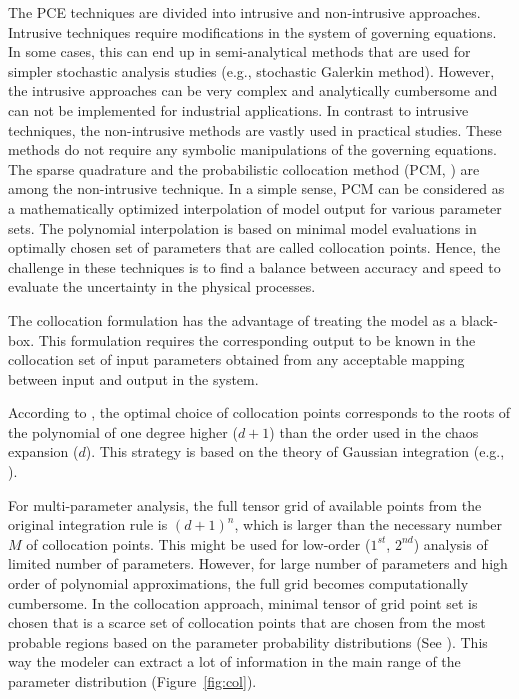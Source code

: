 The PCE techniques are divided into intrusive
\cite{Ghanem1993,Matthies2005,Xiu2003} and non-intrusive
\cite{Keese2003,Isukapalli1998,nLi2007,oladyshkinintegrative} approaches.
Intrusive techniques require modifications in the system of governing
equations. In some cases, this can end up in semi-analytical methods that are
used for simpler stochastic analysis studies (e.g., stochastic Galerkin
method). However, the intrusive approaches can be very complex and analytically
cumbersome and can not be implemented for industrial applications. In contrast
to intrusive techniques, the non-intrusive methods are vastly used in practical
studies. These methods do not require any symbolic manipulations of the
governing equations. The sparse quadrature and the probabilistic collocation
method (PCM, \cite{nLi2007,oladyshkinintegrative}) are among the non-intrusive
technique. In a simple sense, PCM can be considered as a mathematically
optimized interpolation of model output for various parameter sets. The
polynomial interpolation is based on minimal model evaluations in optimally
chosen set of parameters that are called collocation points. Hence, the
challenge in these techniques is to find a balance between accuracy and speed
to evaluate the uncertainty in the physical processes.

The collocation formulation has the advantage of treating the model as a
black-box. This formulation requires the corresponding output to be known in
the collocation set of input parameters obtained from any acceptable mapping
between input and output in the system.

According to \cite{Villadsen1978}, the optimal choice of collocation
points corresponds to the roots of the polynomial of one degree higher ($d+1$)
than the order used in the chaos expansion ($d$). This strategy is based on the
theory of Gaussian integration (e.g., \cite{Abramowitz1965}). 

For multi-parameter analysis, the full tensor grid of available points from the
original integration rule is $(d+1)^n$, which is larger than the necessary
number
$M$ of collocation points. This might be used for low-order
($1^{st}$, $2^{nd}$) analysis of limited number of parameters. However, for
large number of parameters and high order of polynomial approximations, the
full grid becomes computationally cumbersome. In the collocation approach,
minimal tensor of grid point set is chosen that is a scarce set of collocation
points that are chosen from the most probable regions based on the parameter
probability distributions (See
\cite{nLi2007,oladyshkinintegrative,oladyshkin2011concept}). This way the
modeler can extract a lot of information in the main range of the parameter
distribution (Figure~\ref{fig:col}).

